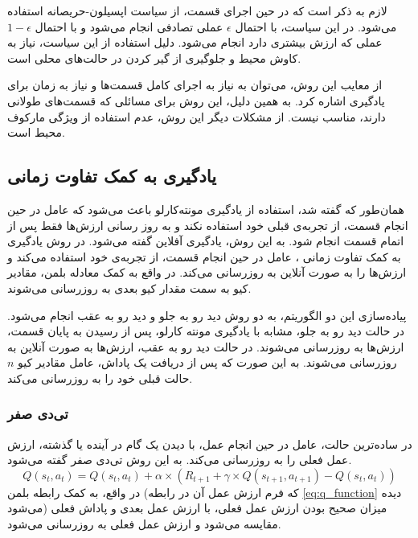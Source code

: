 لازم به ذکر است که در حین اجرای قسمت، از سیاست اپسیلون-حریصانه  استفاده می‌شود.
در این سیاست، با احتمال $\epsilon$ عملی تصادفی انجام می‌شود و با احتمال $1-\epsilon$ عملی که ارزش بیشتری دارد انجام می‌شود.
دلیل استفاده از این سیاست، نیاز به کاوش محیط و جلوگیری از گیر کردن در حالت‌های محلی است.

از معایب این روش، می‌توان به نیاز به اجرای کامل قسمت‌ها و نیاز به زمان برای یادگیری اشاره کرد. به همین دلیل، این روش برای مسائلی که قسمت‌های طولانی دارند، مناسب نیست.
از مشکلات دیگر این روش، عدم استفاده از ویژگی مارکوف محیط است.
\subsection{یادگیری به کمک تفاوت زمانی}
همان‌طور که گفته شد، استفاده از یادگیری مونته‌کارلو باعث می‌شود که عامل در حین انجام قسمت، از تجربه‌ی قبلی خود استفاده نکند
و به روز رسانی ارزش‌ها فقط پس از اتمام قسمت انجام شود. به این روش، یادگیری آفلاین  گفته می‌شود.
در روش یادگیری به کمک تفاوت زمانی ،
عامل در حین انجام قسمت، از تجربه‌ی خود استفاده می‌کند و ارزش‌ها را به صورت آنلاین به روزرسانی می‌کند.
در واقع به کمک معادله بلمن، مقادیر کیو به سمت مقدار کیو بعدی به روزرسانی می‌شوند.

پیاده‌سازی این دو الگوریتم، به دو روش دید رو به جلو و دید رو به عقب انجام می‌شود.
در حالت دید رو به جلو، مشابه با یادگیری مونته کارلو، پس از رسیدن به پایان قسمت، ارزش‌ها به روزرسانی می‌شوند.
در حالت دید رو به عقب، ارزش‌ها به صورت آنلاین به روزرسانی می‌شوند. به این صورت که پس از دریافت یک پاداش، عامل مقادیر کیو $n$ حالت‌ قبلی خود را به روزرسانی می‌کند.
\subsubsection{تی‌دی صفر}
در ساده‌ترین حالت، عامل در حین انجام عمل، با دیدن یک گام در آینده یا گذشته، ارزش عمل فعلی را به روزرسانی می‌کند.
به این روش تی‌دی صفر  گفته می‌شود.
\begin{equation}\label{eq:td_zero_q_function}
    Q(s_t, a_t) = Q(s_t, a_t) + \alpha \times (R_{t+1} + \gamma \times Q(s_{t+1}, a_{t+1}) - Q(s_t, a_t))
\end{equation}
در واقع، به کمک رابطه بلمن
(که فرم ارزش عمل آن در رابطه  \ref{eq:q_function} دیده می‌شود)
میزان صحیح بودن ارزش عمل فعلی، با ارزش عمل بعدی و پاداش فعلی مقایسه می‌شود و ارزش عمل فعلی به روزرسانی می‌شود.
